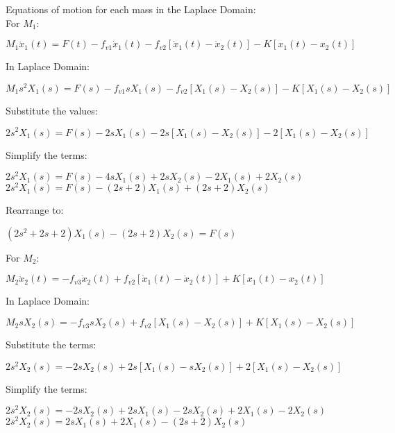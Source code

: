 \documentclass[11pt,letterpaper]{article}
\begin{document}
Equations of motion for each mass in the Laplace Domain:\\[12pt]
For $M_1$:\\[12pt]
\begin{center}
	$M_1\ddot{x}_1(t)=F(t)-f_{v1}\dot{x}_1(t)-f_{v2}[\dot{x}_1(t)-\dot{x}_2(t)]-K[x_1(t)-x_2(t)]$\\
\end{center}
In Laplace Domain:\\
\begin{center}
	$M_1s^2X_1(s)=F(s)-f_{v1}sX_1(s)-f_{v2}[X_1(s)-X_2(s)]-K[X_1(s)-X_2(s)]$\\
\end{center}
Substitute the values:\\
\begin{center}
	$2s^2X_1(s)=F(s)-2sX_1(s)-2s[X_1(s)-X_2(s)]-2[X_1(s)-X_2(s)]$\\
\end{center}
Simplify the terms:\\
\begin{center}
	$2s^2X_1(s)=F(s)-4sX_1(s)+2sX_2(s)-2X_1(s)+2X_2(s)$\\[12pt]
	$2s^2X_1(s)=F(s)-(2s+2)X_1(s)+(2s+2)X_2(s)$\\[12pt]
\end{center}
Rearrange to:\\
\begin{center}
	$(2s^2+2s+2)X_1(s)-(2s+2)X_2(s)=F(s)$\\
\end{center}
For $M_2$:\\[12pt]
\begin{center}
	$M_2\ddot{x}_2(t)=-f_{v3}\dot{x}_2(t)+f_{v2}[\dot{x}_1(t)-\dot{x}_2(t)]+K[x_1(t)-x_2(t)]$\\
\end{center}
In Laplace Domain:\\
\begin{center}
	$M_2sX_2(s)=-f_{v3}sX_2(s)+f_{v2}[X_1(s)-X_2(s)]+K[X_1(s)-X_2(s)]$\\
\end{center}
Substitute the terms:\\
\begin{center}
	$2s^2X_2(s)=-2sX_2(s)+2s[X_1(s)-sX_2(s)]+2[X_1(s)-X_2(s)]$\\
\end{center}
Simplify the terms:\\
\begin{center}
	$2s^2X_2(s)=-2sX_2(s)+2sX_1(s)-2sX_2(s)+2X_1(s)-2X_2(s)$\\[12pt]
	$2s^2X_2(s)=2sX_1(s)+2X_1(s)-(2s+2)X_2(s)$\\[12pt]
\end{center}
\end{document}
